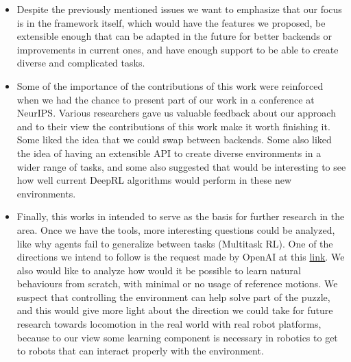 \begin{itemize}
    \item Despite the previously mentioned issues we want to emphasize that our
          focus is in the framework itself, which would have the features we proposed,
          be extensible enough that can be adapted in the future for better
          backends or improvements in current ones, and have enough support to be
          able to create diverse and complicated tasks.

    \item Some of the importance of the contributions of this work were
          reinforced when we had the chance to present part of our work in a conference
          at NeurIPS. Various researchers gave us valuable feedback about our approach
          and to their view the contributions of this work make it worth finishing it.
          Some liked the idea that we could swap between backends. Some also liked
          the idea of having an extensible API to create diverse environments in a wider
          range of tasks, and some also suggested that would be interesting to see 
          how well current DeepRL algorithms would perform in these new environments.

    \item Finally, this works in intended to serve as the basis for further research
          in the area. Once we have the tools, more interesting questions could be analyzed,
          like why agents fail to generalize between tasks (Multitask RL). One of the
          directions we intend to follow is the request made by OpenAI at this 
          \href{https://openai.com/requests-for-research/#multitask-rl-with-continuous-actions}{link}.
          We also would like to analyze how would it be possible to learn natural
          behaviours from scratch, with minimal or no usage of reference motions. We
          suspect that controlling the environment can help solve part of the puzzle,
          and this would give more light about the direction we could take for future
          research towards locomotion in the real world with real robot platforms,
          because to our view some learning component is necessary in robotics
          to get to robots that can interact properly with the environment.
\end{itemize}

